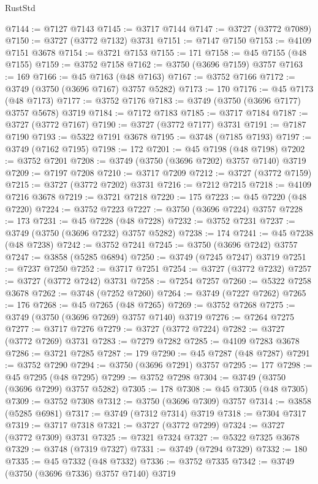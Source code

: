 \begin{lexlean}{RustStd}
\begin{coremodule}
@7144 := @7127 @7143
@7145 := @3717 @7144
@7147 := @3727 (@3772 @7089)
@7150 := @3727 (@3772 @7132) @3731
@7151 := @7147 @7150
@7153 := @4109 @7151 @3678
@7154 := @3721 @7153
@7155 := 171
@7158 := @45 @7155 (@48 @7155)
@7159 := @3752 @7158
@7162 := @3750 (@3696 @7159) @3757
@7163 := 169
@7166 := @45 @7163 (@48 @7163)
@7167 := @3752 @7166
@7172 := @3749 (@3750 (@3696 @7167) @3757 @5282)
@7173 := 170
@7176 := @45 @7173 (@48 @7173)
@7177 := @3752 @7176
@7183 := @3749 (@3750 (@3696 @7177) @3757 @5678) @3719
@7184 := @7172 @7183
@7185 := @3717 @7184
@7187 := @3727 (@3772 @7167)
@7190 := @3727 (@3772 @7177) @3731
@7191 := @7187 @7190
@7193 := @5322 @7191 @3678
@7195 := @3748 (@7185 @7193)
@7197 := @3749 (@7162 @7195)
@7198 := 172
@7201 := @45 @7198 (@48 @7198)
@7202 := @3752 @7201
@7208 := @3749 (@3750 (@3696 @7202) @3757 @7140) @3719
@7209 := @7197 @7208
@7210 := @3717 @7209
@7212 := @3727 (@3772 @7159)
@7215 := @3727 (@3772 @7202) @3731
@7216 := @7212 @7215
@7218 := @4109 @7216 @3678
@7219 := @3721 @7218
@7220 := 175
@7223 := @45 @7220 (@48 @7220)
@7224 := @3752 @7223
@7227 := @3750 (@3696 @7224) @3757
@7228 := 173
@7231 := @45 @7228 (@48 @7228)
@7232 := @3752 @7231
@7237 := @3749 (@3750 (@3696 @7232) @3757 @5282)
@7238 := 174
@7241 := @45 @7238 (@48 @7238)
@7242 := @3752 @7241
@7245 := @3750 (@3696 @7242) @3757
@7247 := @3858 (@5285 @6894)
@7250 := @3749 (@7245 @7247) @3719
@7251 := @7237 @7250
@7252 := @3717 @7251
@7254 := @3727 (@3772 @7232)
@7257 := @3727 (@3772 @7242) @3731
@7258 := @7254 @7257
@7260 := @5322 @7258 @3678
@7262 := @3748 (@7252 @7260)
@7264 := @3749 (@7227 @7262)
@7265 := 176
@7268 := @45 @7265 (@48 @7265)
@7269 := @3752 @7268
@7275 := @3749 (@3750 (@3696 @7269) @3757 @7140) @3719
@7276 := @7264 @7275
@7277 := @3717 @7276
@7279 := @3727 (@3772 @7224)
@7282 := @3727 (@3772 @7269) @3731
@7283 := @7279 @7282
@7285 := @4109 @7283 @3678
@7286 := @3721 @7285
@7287 := 179
@7290 := @45 @7287 (@48 @7287)
@7291 := @3752 @7290
@7294 := @3750 (@3696 @7291) @3757
@7295 := 177
@7298 := @45 @7295 (@48 @7295)
@7299 := @3752 @7298
@7304 := @3749 (@3750 (@3696 @7299) @3757 @5282)
@7305 := 178
@7308 := @45 @7305 (@48 @7305)
@7309 := @3752 @7308
@7312 := @3750 (@3696 @7309) @3757
@7314 := @3858 (@5285 @6981)
@7317 := @3749 (@7312 @7314) @3719
@7318 := @7304 @7317
@7319 := @3717 @7318
@7321 := @3727 (@3772 @7299)
@7324 := @3727 (@3772 @7309) @3731
@7325 := @7321 @7324
@7327 := @5322 @7325 @3678
@7329 := @3748 (@7319 @7327)
@7331 := @3749 (@7294 @7329)
@7332 := 180
@7335 := @45 @7332 (@48 @7332)
@7336 := @3752 @7335
@7342 := @3749 (@3750 (@3696 @7336) @3757 @7140) @3719

\end{coremodule}
\end{lexlean}
